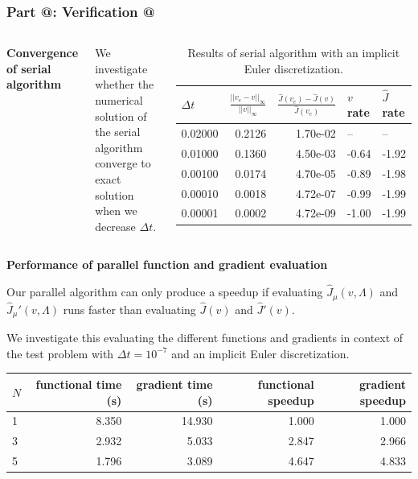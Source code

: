 \documentclass[9pt]{beamer}
\makeatletter
\newcommand*{\rom}[1]{\expandafter\@slowromancap\romannumeral #1@}
\makeatother
\begin{document}
\begin{frame}
\frametitle{\textbf{ Part \rom{4}:} Verification \rom{3}}
\begin{columns}
\textbf{Convergence of serial algorithm}
\begin{itemize}
{\small
\item{We investigate whether the numerical solution of the serial algorithm converge to exact solution when we decrease $\Delta t$.}
}
\end{itemize}
{\tiny
\begin{table}[!h]
\caption{{\tiny Results of serial algorithm with an implicit Euler discretization.}} \label{IE_convergence}
\centering
\begin{tabular}{lrrll}
\toprule
{} $\Delta t$&    $\frac{||v_e-v||_{\infty}}{||v||_{\infty}}$ &  $\frac{\hat J(v_e)-\hat J(v)}{\hat J(v_e)}$ & $v$ rate & $\hat J$  rate \\
\midrule
0.02000 &  0.2126 &  1.70e-02 &        -- &       -- \\
0.01000 &  0.1360 &  4.50e-03 & -0.64 & -1.92 \\
0.00100 &  0.0174 &  4.70e-05 & -0.89 & -1.98 \\
0.00010 &  0.0018 &  4.72e-07 &   -0.99 & -1.99 \\
0.00001 &  0.0002 &  4.72e-09 &  -1.00 & -1.99 \\
\bottomrule
\end{tabular}
\end{table}}
\end{columns}
\textbf{Performance of parallel function and gradient evaluation}
\begin{itemize}
{\small
\item{Our parallel algorithm can only produce a speedup if evaluating $\hat J_{\mu}(v,\Lambda)$ and $\hat J_{\mu}'(v,\Lambda)$ runs faster than evaluating $\hat J(v)$ and $\hat J '(v)$.}
\item{We investigate this evaluating the different functions and gradients in context of the test problem with $\Delta t= 10^{-7}$ and an implicit Euler discretization. }}
\end{itemize}
{\tiny
\begin{table}[!h]
\centering
\begin{tabular}{lrrrr}
\toprule
{}$N$ &  functional time (s) &  gradient time (s) &  functional speedup &  gradient speedup \\
\midrule
1 &           8.350 &         14.930 &            1.000 &          1.000 \\
3 &           2.932 &          5.033 &            2.847 &          2.966 \\
5 &           1.796 &          3.089 &            4.647 &          4.833 \\
\bottomrule
\end{tabular}
\end{table}}
\end{frame}
\end{document}
